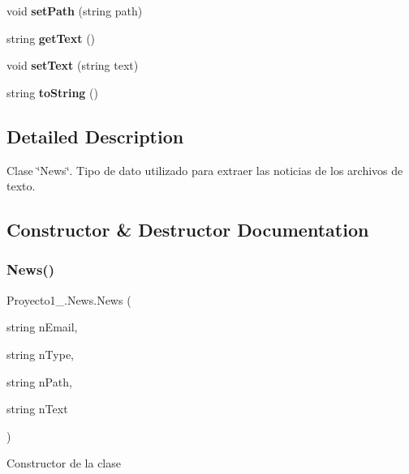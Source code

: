 \begin{DoxyCompactItemize}
void {\bfseries set\+Path} (string path)
\item 
\mbox{\label{class_proyecto1__1096917_1_1_news_a10751e00e06d93c0e93c73f68877a240}} 
string {\bfseries get\+Text} ()
\item 
\mbox{\label{class_proyecto1__1096917_1_1_news_aa794c357aa54179cacd2c42e8421eeac}} 
void {\bfseries set\+Text} (string text)
\item 
\mbox{\label{class_proyecto1__1096917_1_1_news_a9eca1fd7f72feb28f6c518a21d7486fd}} 
string {\bfseries to\+String} ()
\end{DoxyCompactItemize}


\subsection{Detailed Description}
Clase \char`\"{}\+News\char`\"{}. Tipo de dato utilizado para extraer las noticias de los archivos de texto. 



\subsection{Constructor \& Destructor Documentation}
\mbox{\label{class_proyecto1__1096917_1_1_news_a137a8d0b1d8d226db2895518c7cba0a6}} 
\subsubsection{\texorpdfstring{News()}{News()}}
{\footnotesize\ttfamily Proyecto1\+\_.\+News.\+News (\begin{DoxyParamCaption}\item[{string}]{n\+Email,  }\item[{string}]{n\+Type,  }\item[{string}]{n\+Path,  }\item[{string}]{n\+Text }\end{DoxyParamCaption})}



Constructor de la clase 


